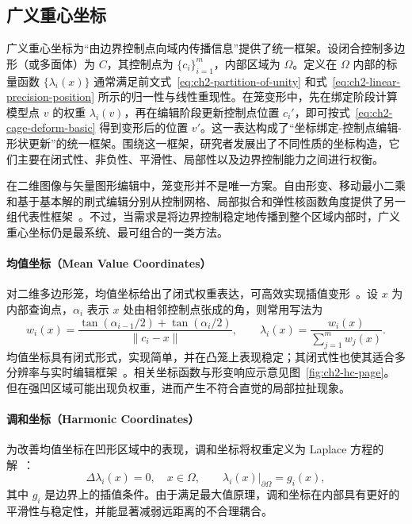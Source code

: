 \subsection{广义重心坐标}
广义重心坐标为“由边界控制点向域内传播信息”提供了统一框架。设闭合控制多边形（或多面体）为 \(C\)，其控制点为 \(\{c_i\}_{i=1}^{m}\)，内部区域为 \(\Omega\)。定义在 \(\Omega\) 内部的标量函数 \(\{\lambda_i(x)\}\) 通常满足前文式~\eqref{eq:ch2-partition-of-unity} 和式~\eqref{eq:ch2-linear-precision-position} 所示的归一性与线性重现性。在笼变形中，先在绑定阶段计算模型点 \(v\) 的权重 \(\lambda_i(v)\)，再在编辑阶段更新控制点位置 \(c_i'\)，即可按式~\eqref{eq:ch2-cage-deform-basic} 得到变形后的位置 \(v'\)。这一表达构成了“坐标绑定-控制点编辑-形状更新”的统一框架。围绕这一框架，研究者发展出了不同性质的坐标构造，它们主要在闭式性、非负性、平滑性、局部性以及边界控制能力之间进行权衡。

在二维图像与矢量图形编辑中，笼变形并不是唯一方案。自由形变、移动最小二乘和基于基本解的刷式编辑分别从控制网格、局部拟合和弹性核函数角度提供了另一组代表性框架~\cite{Sederberg1986,Schaefer2006,DeGoes2017}。不过，当需求是将边界控制稳定地传播到整个区域内部时，广义重心坐标仍是最系统、最可组合的一类方法。

\paragraph{均值坐标（Mean Value Coordinates）}
对二维多边形笼，均值坐标给出了闭式权重表达，可高效实现插值变形~\cite{Floater2003,Hormann2006,Ju2005}。设 \(x\) 为内部查询点，\(\alpha_i\) 表示 \(x\) 处由相邻控制点张成的角，则常用写法为
\begin{equation}
w_i(x)=\frac{\tan(\alpha_{i-1}/2)+\tan(\alpha_i/2)}{\|c_i-x\|},\qquad
\lambda_i(x)=\frac{w_i(x)}{\sum_{j=1}^{m} w_j(x)}.
\end{equation}
均值坐标具有闭式形式，实现简单，并在凸笼上表现稳定；其闭式性也使其适合多分辨率与实时编辑框架~\cite{Huang2006,Farbman2009}。相关坐标函数与形变响应示意见图~\ref{fig:ch2-hc-page}。但在强凹区域可能出现负权重，进而产生不符合直觉的局部拉扯现象。

\paragraph{调和坐标（Harmonic Coordinates）}
为改善均值坐标在凹形区域中的表现，调和坐标将权重定义为 Laplace 方程的解~\cite{Joshi2007,Lipman2007}：
\begin{equation}
\Delta \lambda_i(x)=0,\quad x\in\Omega,\qquad
\lambda_i(x)\big|_{\partial\Omega}=g_i(x),
\end{equation}
其中 \(g_i\) 是边界上的插值条件。由于满足最大值原理，调和坐标在内部具有更好的平滑性与稳定性，并能显著减弱远距离的不合理耦合。

